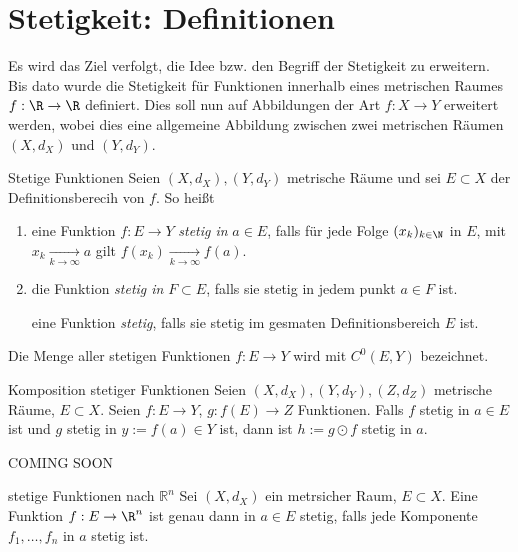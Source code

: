 \section{Stetigkeit: Definitionen}
\label{sec:3.1}

Es wird das Ziel verfolgt, die Idee bzw. den Begriff der Stetigkeit zu erweitern. Bis dato wurde die Stetigkeit für Funktionen innerhalb eines metrischen Raumes $f:\R \to \R$ definiert.
Dies soll nun auf Abbildungen der Art $f:X\to Y$ erweitert werden, wobei dies eine allgemeine Abbildung zwischen zwei metrischen Räumen $(X,d_X)$ und $(Y,d_Y)$.

\begin{definition}{Stetige Funktionen}
    Seien $(X,d_X), (Y,d_Y)$ metrische Räume und sei $E\subset X$ der Definitionsberecih von $f$. So heißt
    \begin{enumerate}
        \item eine Funktion $f:E\to Y$ \emph{stetig in} $a\in E$, falls für jede Folge $(x_k)_{k\in \N}$ in $E$, mit $x_k \underset{k\to\infty}{\longrightarrow} a$ gilt $f(x_k) \underset{k\to\infty}{\longrightarrow} f(a)$.
        \item die Funktion \emph{stetig in} $F\subset E$, falls sie stetig in jedem punkt $a\in F$ ist.
        
        eine Funktion \emph{stetig}, falls sie stetig im gesmaten Definitionsbereich $E$ ist.
    \end{enumerate}

    Die Menge aller stetigen Funktionen $f:E \to Y$ wird mit $C^0(E,Y)$ bezeichnet.
\end{definition}

\begin{lemma}{Komposition stetiger Funktionen}
    Seien $(X,d_X), (Y,d_Y), (Z,d_Z)$ metrische Räume, $E \subset X$. 
    \vspace{1em}
    Seien $f:E \to Y$, $g:f(E)\to Z$ Funktionen.
    \vspace{1em}
    Falls $f$ stetig in $a\in E$ ist und $g$ stetig in $y:=f(a)\in Y$ ist, dann ist $h:= g\odot f$ stetig in $a$.
\end{lemma}

\begin{beweisbox}
COMING SOON    
\end{beweisbox}

\begin{lemma}{stetige Funktionen nach $\mathbb{R}^{n}$}
    Sei $(X,d_X)$ ein metrsicher Raum, $E\subset X$.
    \vspace{1em}
    Eine Funktion $f:E\to \R^n$ ist genau dann in $a \in E$ stetig, falls jede Komponente $f_1,\dots,f_n$ in $a$ stetig ist.
\end{lemma}

